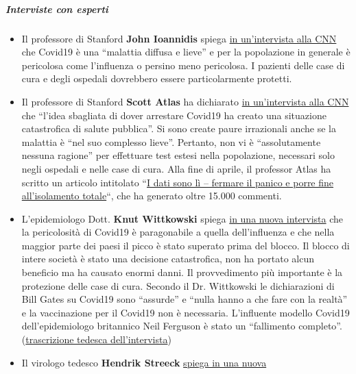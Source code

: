 \hypertarget{interviste-con-esperti}{%
\subparagraph{\texorpdfstring{\textbf{Interviste con
esperti}}{Interviste con esperti}}\label{interviste-con-esperti}}

\begin{itemize}
\tightlist
\item
  Il professore di Stanford \textbf{John Ioannidis} spiega
  \href{https://twitter.com/cnn/status/1256579248342564865}{in
  un'intervista alla CNN} che Covid19 è una ``malattia diffusa e lieve''
  e per la popolazione in generale è pericolosa come l'influenza o
  persino meno pericolosa. I pazienti delle case di cura e degli
  ospedali dovrebbero essere particolarmente protetti.
\item
  Il professore di Stanford \textbf{Scott Atlas} ha dichiarato
  \href{https://www.facebook.com/cnn/posts/10160799274796509}{in
  un'intervista alla CNN} che ``l'idea sbagliata di dover arrestare
  Covid19 ha creato una situazione catastrofica di salute pubblica''. Si
  sono create paure irrazionali anche se la malattia è ``nel suo
  complesso lieve''. Pertanto, non vi è ``assolutamente nessuna
  ragione'' per effettuare test estesi nella popolazione, necessari solo
  negli ospedali e nelle case di cura. Alla fine di aprile, il professor
  Atlas ha scritto un articolo intitolato
  ``\href{https://thehill.com/opinion/healthcare/494034-the-data-are-in-stop-the-panic-and-end-the-total-isolation}{I
  dati sono lì -- fermare il panico e porre fine all'isolamento
  totale}``, che ha generato oltre 15.000 commenti.
\item
  L'epidemiologo Dott. \textbf{Knut Wittkowski} spiega
  \href{https://www.youtube.com/watch?v=k0Q4naYOYDw}{in una nuova
  intervista} che la pericolosità di Covid19 è paragonabile a quella
  dell'influenza e che nella maggior parte dei paesi il picco è stato
  superato prima del blocco. Il blocco di intere società è stato una
  decisione catastrofica, non ha portato alcun beneficio ma ha causato
  enormi danni. Il provvedimento più importante è la protezione delle
  case di cura. Secondo il Dr. Wittkowski le dichiarazioni di Bill Gates
  su Covid19 sono ``assurde'' e ``nulla hanno a che fare con la realtà''
  e la vaccinazione per il Covid19 non è necessaria. L'influente modello
  Covid19 dell'epidemiologo britannico Neil Ferguson è stato un
  ``fallimento completo''.
  (\href{https://vitalstoff.blog/2020/05/01/wir-brauchen-keinen-impfstoff/}{trascrizione
  tedesca dell'intervista})
\item
  Il virologo tedesco \textbf{Hendrik Streeck}
  \href{https://www.youtube.com/watch?v=vrL9QKGQrWk}{spiega in una nuova
}
\end{itemize}
